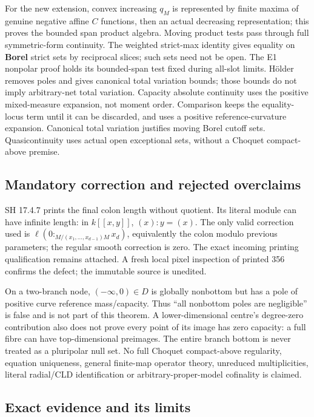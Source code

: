 \documentclass[
]{article}
\begin{document}
For the new extension, convex increasing \(q_M\) is represented by
finite maxima of genuine negative affine \(C\) functions, then an actual
decreasing representation; this proves the bounded span product algebra.
Moving product tests pass through full symmetric-form continuity. The
weighted strict-max identity gives equality on \textbf{Borel} strict
sets by reciprocal slices; such sets need not be open. The E1 nonpolar
proof holds its bounded-span test fixed during all-slot limits. Hölder
removes poles and gives canonical total variation bounds; those bounds
do not imply arbitrary-net total variation. Capacity absolute continuity
uses the positive mixed-measure expansion, not moment order. Comparison
keeps the equality-locus term until it can be discarded, and uses a
positive reference-curvature expansion. Canonical total variation
justifies moving Borel cutoff sets. Quasicontinuity uses actual open
exceptional sets, without a Choquet compact-above premise.

\subsection{Mandatory correction and rejected
overclaims}\label{mandatory-correction-and-rejected-overclaims}

SH 17.4.7 prints the final colon length without quotient. Its literal
module can have infinite length: in \(k[[x,y]]\), \((x):y=(x)\). The
only valid correction used is \(\ell(0:_{M/(x_1,\ldots,x_{d-1})M}x_d)\),
equivalently the colon modulo previous parameters; the regular smooth
correction is zero. The exact incoming printing qualification remains
attached. A fresh local pixel inspection of printed 356 confirms the
defect; the immutable source is unedited.

On a two-branch node, \((-\infty,0)\in D\) is globally nonbottom but has
a pole of positive curve reference mass/capacity. Thus ``all nonbottom
poles are negligible'' is false and is not part of this theorem. A
lower-dimensional centre's degree-zero contribution also does not prove
every point of its image has zero capacity: a full fibre can have
top-dimensional preimages. The entire branch bottom is never treated as
a pluripolar null set. No full Choquet compact-above regularity,
equation uniqueness, general finite-map operator theory, unreduced
multiplicities, literal radial/CLD identification or
arbitrary-proper-model cofinality is claimed.

\subsection{Exact evidence and its
limits}\label{exact-evidence-and-its-limits}
\end{document}
